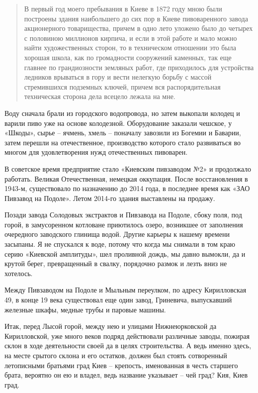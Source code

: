 \begin{quotation}
В первый год моего пребывания в Киеве в 1872 году мною были построены здания наибольшего до сих пор в Киеве пивоваренного завода акционерного товарищества, причем в одно лето уложено было до четырех с половиною миллионов кирпича, и если в этой работе и мало можно найти художественных сторон, то в техническом отношении это была хорошая школа, как по громадности сооружений каменных, так еще главнее по грандиозности земляных работ, где приходилось для устройства ледников врываться в гору и вести нелегкую борьбу с массой стремившихся подземных ключей, причем вся распорядительная техническая сторона дела всецело лежала на мне. 
\end{quotation}

Воду сначала брали из городского водопровода, но затем выкопали колодец и варили пиво уже на основе колодезной. Оборудование заказали чешское, у «Шкоды», сырье – ячмень, хмель – поначалу завозили из Богемии и Баварии, затем перешли на отечественное, производство которого стало развиваться во многом для удовлетворения нужд отечественных пивоварен.

В советское время предприятие стало «Киевским пивзаводом №2» и продолжало работать. Великая Отечественная, немецкая оккупация. После восстановления в 1943-м, существовало по назначению до 2014 года, в последнее время как «ЗАО Пивзавод на Подоле». Летом 2014-го здания выставлены на продажу.

Позади завода Солодовых экстрактов и Пивзавода на Подоле, сбоку поля, под горой, в замусоренном котловане приютилось озеро, возникшее от заполнения очередного заводского глинища водой. Другие карьеры к нашему времени засыпаны. Я не спускался к воде, потому что когда мы снимали в том краю серию «Киевской амплитуды», шел проливной дождь, мы давно вымокли, да и крутой берег, превращенный в свалку, порядочно размок и лезть вниз не хотелось.

Между Пивзаводом на Подоле и Мыльным переулком, по адресу Кирилловская 49, в конце 19 века существовал еще один завод, Гриневича, выпускавший железные шкафы, медные трубы и паровые машины.

Итак, перед Лысой горой, между нею и улицами Нижнеюрковской да Кирилловской, уже много веков подряд действовали различные заводы, пожирая склон в ходе деятельности своей да в целях строительства. А ведь именно здесь, на месте срытого склона и его остатков, должен был стоять сотворенный летописными братьями град Киев – крепость, именованная в честь старшего брата, вероятно он ею и владел, ведь название указывает – чей град? Кия, Киев град. 


